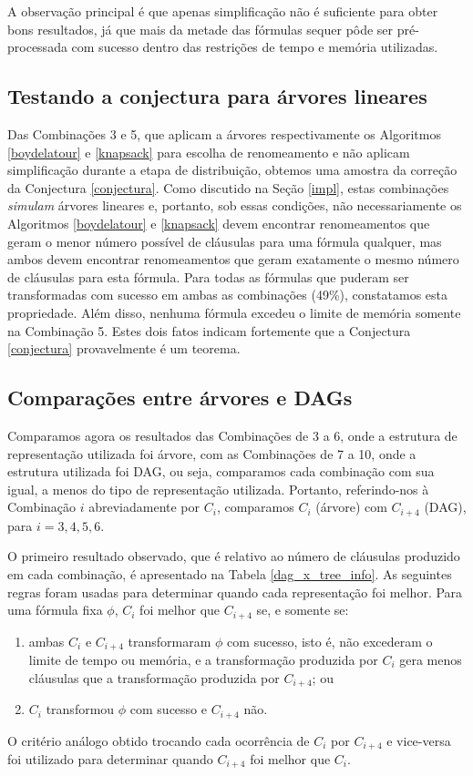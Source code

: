 A observação principal é que apenas simplificação não é suficiente para obter bons resultados, já que mais da metade das fórmulas sequer pôde ser pré-processada com sucesso dentro das restrições de tempo e memória utilizadas.

\subsection{Testando a conjectura para árvores lineares}

\indent

Das Combinações 3 e 5, que aplicam a árvores respectivamente os Algoritmos \ref{boydelatour} e \ref{knapsack} para escolha de renomeamento e não aplicam simplificação durante a etapa de distribuição, obtemos uma amostra da correção da Conjectura \ref{conjectura}. Como discutido na Seção \ref{impl}, estas combinações \emph{simulam} árvores lineares e, portanto, sob essas condições, não necessariamente os Algoritmos \ref{boydelatour} e \ref{knapsack} devem encontrar renomeamentos que geram o menor número possível de cláusulas para uma fórmula qualquer, mas ambos devem encontrar renomeamentos que geram exatamente o mesmo número de cláusulas para esta fórmula. Para todas as fórmulas que puderam ser transformadas com sucesso em ambas as combinações (49\%), constatamos esta propriedade. Além disso, nenhuma fórmula excedeu o limite de memória somente na Combinação 5. Estes dois fatos indicam fortemente que a Conjectura \ref{conjectura} provavelmente é um teorema.

\subsection{Comparações entre árvores e DAGs}
\label{secao_tree_x_dag}

\indent

Comparamos agora os resultados das Combinações de 3 a 6, onde a estrutura de representação utilizada foi árvore, com as Combinações de 7 a 10, onde a estrutura utilizada foi DAG, ou seja, comparamos cada combinação com sua igual, a menos do tipo de representação utilizada. Portanto, referindo-nos à Combinação $i$ abreviadamente por $C_i$, comparamos $C_i$ (árvore) com $C_{i+4}$ (DAG), para $i=3,4,5,6$.

O primeiro resultado observado, que é relativo ao número de cláusulas produzido em cada combinação, é apresentado na Tabela \ref{dag_x_tree_info}. As seguintes regras foram usadas para determinar quando cada representação foi melhor. Para uma fórmula fixa $\phi$, $C_i$ foi melhor que $C_{i+4}$ se, e somente se:
\begin{enumerate}
	\item ambas $C_i$ e $C_{i+4}$ transformaram $\phi$ com sucesso, isto é, não excederam o limite de tempo ou memória, e a transformação produzida por $C_i$ gera menos cláusulas que a transformação produzida por $C_{i+4}$; ou
	\item $C_i$ transformou $\phi$ com sucesso e $C_{i+4}$ não.
\end{enumerate}
O critério análogo obtido trocando cada ocorrência de $C_i$ por $C_{i+4}$ e vice-versa foi utilizado para determinar quando $C_{i+4}$ foi melhor que $C_i$.

